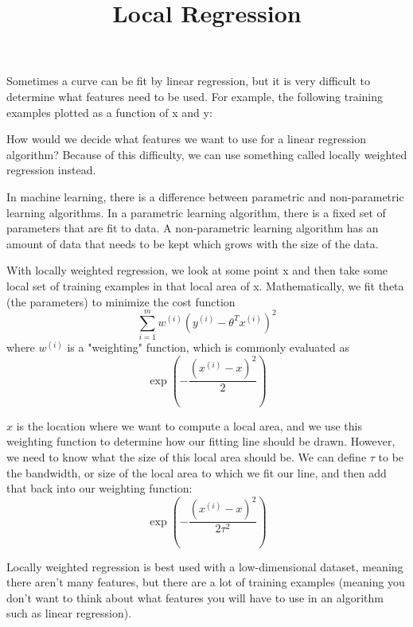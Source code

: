 \documentclass[11pt]{article}
\title{Local Regression}
\author{}
\date{}
\begin{document}
\maketitle
\vspace{-1.2em}
Sometimes a curve can be fit by linear regression, but it is very difficult to determine what features need to be used. For example, the following training examples plotted as a function of x and y: \hfill
\vspace{1em}
\begin{center}
\end{center}
How would we decide what features we want to use for a linear regression algorithm?
Because of this difficulty, we can use something called locally weighted regression instead.

In machine learning, there is a difference between parametric and non-parametric learning algorithms.
In a parametric learning algorithm, there is a fixed set of parameters that are fit to data.
A non-parametric learning algorithm has an amount of data that needs to be kept which grows with
the size of the data.

With locally weighted regression, we look at some point x and then take some local set of
training examples in that local area of x. Mathematically, we fit theta (the parameters) to
minimize the cost function
$$\sum_{i=1}^{m} {w^{(i)} \left ( y^{(i)} - \theta^{T}x^{(i)} \right )}^{2}$$
where $w^{(i)}$ is a "weighting" function, which is commonly evaluated as
$$\exp {\left( -\frac{\left( x^{(i)}-x \right)^{2}}{2} \right)}$$

$x$ is the location where we want to compute a local area, and we use this weighting function
to determine how our fitting line should be drawn. However, we need to know what the size of this
local area should be. We can define $\tau$ to be the bandwidth, or size of the local area to which we
fit our line, and then add that back into our weighting function:
$$\exp {\left( -\frac{\left( x^{(i)}-x \right)^{2}}{2\tau^{2}} \right)}$$

Locally weighted regression is best used with a low-dimensional dataset, meaning there
aren't many features, but there are a lot of training examples (meaning you don't want to think about
what features you will have to use in an algorithm such as linear regression).
\end{document}
